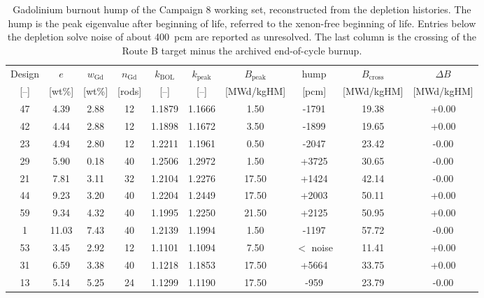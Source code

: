 \begin{table}[htbp]
  \centering
  \small
  \caption[Gadolinium burnout hump of the Campaign 8 working set]{Gadolinium burnout hump of the Campaign 8 working set, reconstructed from the depletion histories. The hump is the peak eigenvalue after beginning of life, referred to the xenon-free beginning of life. Entries below the depletion solve noise of about \SI{400}{pcm} are reported as unresolved. The last column is the crossing of the Route B target minus the archived end-of-cycle burnup.}
  \label{tab:c8-hump}
  \begin{tabular}{cccccccccc}
    \toprule
    Design & $e$ & $w_\mathrm{Gd}$ & $n_\mathrm{Gd}$ & $k_\mathrm{BOL}$ &
      $k_\mathrm{peak}$ & $B_\mathrm{peak}$ & hump & $B_\mathrm{cross}$ &
      $\Delta B$ \\
    {[--]} & [wt\%] & [wt\%] & [rods] & [--] & [--] & [MWd/kgHM] &
      [pcm] & [MWd/kgHM] & [MWd/kgHM] \\
    \midrule
    47 & 4.39 & 2.88 & 12 & 1.1879 & 1.1666 & 1.50 & -1791 & 19.38 & +0.00 \\
    42 & 4.44 & 2.88 & 12 & 1.1898 & 1.1672 & 3.50 & -1899 & 19.65 & +0.00 \\
    23 & 4.94 & 2.80 & 12 & 1.2211 & 1.1961 & 0.50 & -2047 & 23.42 & -0.00 \\
    29 & 5.90 & 0.18 & 40 & 1.2506 & 1.2972 & 1.50 & +3725 & 30.65 & -0.00 \\
    21 & 7.81 & 3.11 & 32 & 1.2104 & 1.2276 & 17.50 & +1424 & 42.14 & -0.00 \\
    44 & 9.23 & 3.20 & 40 & 1.2204 & 1.2449 & 17.50 & +2003 & 50.11 & +0.00 \\
    59 & 9.34 & 4.32 & 40 & 1.1995 & 1.2250 & 21.50 & +2125 & 50.95 & +0.00 \\
    1 & 11.03 & 7.43 & 40 & 1.2139 & 1.1994 & 1.50 & -1197 & 57.72 & -0.00 \\
    53 & 3.45 & 2.92 & 12 & 1.1101 & 1.1094 & 7.50 & $<$ noise & 11.41 & +0.00 \\
    31 & 6.59 & 3.38 & 40 & 1.1218 & 1.1853 & 17.50 & +5664 & 33.75 & +0.00 \\
    13 & 5.14 & 5.25 & 24 & 1.1299 & 1.1190 & 17.50 & -959 & 23.79 & -0.00 \\
    \bottomrule
  \end{tabular}
\end{table}
